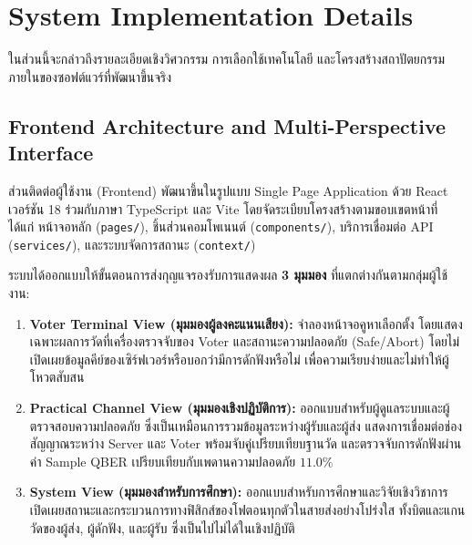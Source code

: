 \section{System Implementation Details}
ในส่วนนี้จะกล่าวถึงรายละเอียดเชิงวิศวกรรม การเลือกใช้เทคโนโลยี และโครงสร้างสถาปัตยกรรมภายในของซอฟต์แวร์ที่พัฒนาขึ้นจริง

\subsection{Frontend Architecture and Multi-Perspective Interface}
ส่วนติดต่อผู้ใช้งาน (Frontend) พัฒนาขึ้นในรูปแบบ Single Page Application ด้วย React เวอร์ชัน 18 ร่วมกับภาษา TypeScript และ Vite โดยจัดระเบียบโครงสร้างตามขอบเขตหน้าที่ ได้แก่ หน้าจอหลัก (\texttt{pages/}), ชิ้นส่วนคอมโพเนนต์ (\texttt{components/}), บริการเชื่อมต่อ API (\texttt{services/}), และระบบจัดการสถานะ (\texttt{context/})

ระบบได้ออกแบบให้ขั้นตอนการส่งกุญแจรองรับการแสดงผล \textbf{3 มุมมอง} ที่แตกต่างกันตามกลุ่มผู้ใช้งาน:
\begin{enumerate}
    \item \textbf{Voter Terminal View (มุมมองผู้ลงคะแนนเสียง):} จำลองหน้าจอคูหาเลือกตั้ง โดยแสดงเฉพาะผลการวัดที่เครื่องตรวจจับของ Voter และสถานะความปลอดภัย (Safe/Abort) โดยไม่เปิดเผยข้อมูลคีย์ของเซิร์ฟเวอร์หรือบอกว่ามีการดักฟังหรือไม่ เพื่อความเรียบง่ายและไม่ทำให้ผู้โหวตสับสน
    \item \textbf{Practical Channel View (มุมมองเชิงปฏิบัติการ):} ออกแบบสำหรับผู้ดูแลระบบและผู้ตรวจสอบความปลอดภัย ซึ่งเป็นเหมือนการรวมข้อมูลระหว่างผู้รับและผู้ส่ง แสดงการเชื่อมต่อช่องสัญญาณระหว่าง Server และ Voter พร้อมจับคู่เปรียบเทียบฐานวัด และตรวจจับการดักฟังผ่านค่า Sample QBER เปรียบเทียบกับเพดานความปลอดภัย $11.0\%$
    \item \textbf{System View (มุมมองสำหรับการศึกษา):} ออกแบบสำหรับการศึกษาและวิจัยเชิงวิชาการ เปิดเผยสถานะและกระบวนการทางฟิสิกส์ของโฟตอนทุกตัวในสายส่งอย่างโปร่งใส ทั้งบิตและแกนวัดของผู้ส่ง, ผู้ดักฟัง, และผู้รับ ซึ่งเป็นไปไม่ได้ในเชิงปฏิบัติ
\end{enumerate}

